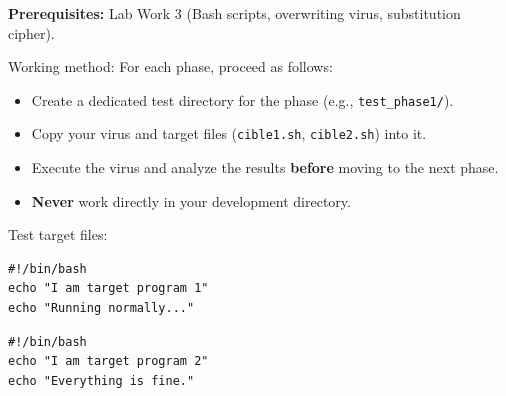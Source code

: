 \documentclass[a4paper,11pt]{article}
\theoremstyle{plain}
\theoremstyle{definition}
\begin{document}
\medskip
\noindent\textbf{Prerequisites:} Lab Work 3 (Bash scripts, overwriting virus, substitution cipher).

\bigskip

{\Large Working method:} For each phase, proceed as follows:
\begin{itemize}
\item Create a dedicated test directory for the phase (e.g., \texttt{test\_phase1/}).
\item Copy your virus and target files (\texttt{cible1.sh}, \texttt{cible2.sh}) into it.
\item Execute the virus and analyze the results \textbf{before} moving to the next phase.
\item \textbf{Never} work directly in your development directory.
\end{itemize}

\noindent Test target files:
\begin{lstlisting}[title=cible1.sh]
#!/bin/bash
echo "I am target program 1"
echo "Running normally..."
\end{lstlisting}
\begin{lstlisting}[title=cible2.sh]
#!/bin/bash
echo "I am target program 2"
echo "Everything is fine."
\end{lstlisting}

\bigskip

\end{document}
